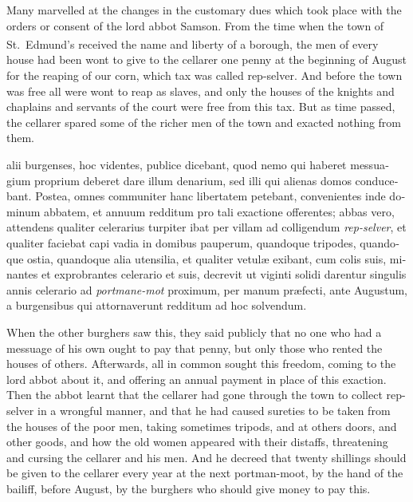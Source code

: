 \documentclass{book}
\newcounter{engnote}
\newcommand{\engnotenum}{\textsuperscript{\arabic{engnote}\stepcounter{engnote}}}
\begin{document}
\begin{paracol}{2}
\begin{otherlanguage}{latin}
\end{otherlanguage}

\switchcolumn

Many marvelled at the changes in the customary dues which took place with the orders or consent of the lord abbot Samson. From the time when the town of St.\ Edmund's received the name and liberty of a borough,\engnotenum{} the men of every house had been wont to give to the cellarer one penny at the beginning of August for the reaping of our corn, which tax was called rep-selver. And before the town was free all were wont to reap as slaves, and only the houses of the knights and chaplains and servants of the court were free from this tax. But as time passed, the cellarer spared some of the richer men of the town and exacted nothing from them.

\switchcolumn*

\begin{otherlanguage}{latin}
alii burgenses, hoc videntes, publice dicebant, quod nemo qui haberet messuagium proprium deberet dare illum denarium, sed illi qui alienas domos conducebant. Postea, omnes communiter hanc libertatem petebant, convenientes inde dominum abbatem, et annuum redditum pro tali exactione offerentes; abbas vero, attendens qualiter celerarius turpiter ibat per villam ad colligendum \emph{rep-selver}, et qualiter faciebat capi vadia in domibus pauperum, quandoque tripodes, quandoque ostia, quandoque alia utensilia, et qualiter vetul\ae{} exibant, cum colis suis, minantes et exprobrantes celerario et suis, decrevit ut viginti solidi darentur singulis annis celerario ad \emph{portmane-mot} proximum, per manum pr\ae{}fecti, ante Augustum, a burgensibus qui attornaverunt redditum ad hoc solvendum.
\end{otherlanguage}

\switchcolumn

When the other burghers saw this, they said publicly that no one who had a messuage of his own ought to pay that penny, but only those who rented the houses of others. Afterwards, all in common sought this freedom, coming to the lord abbot about it, and offering an annual payment in place of this exaction. Then the abbot learnt that the cellarer had gone through the town to collect rep-selver in a wrongful manner, and that he had caused sureties to be taken from the houses of the poor men, taking sometimes tripods, and at others doors, and other goods, and how the old women appeared with their distaffs, threatening and cursing the cellarer and his men. And he decreed that twenty shillings should be given to the cellarer every year at the next portman-moot, by the hand of the bailiff, before August, by the burghers who should give money to pay this.


\end{paracol}
\end{document}
